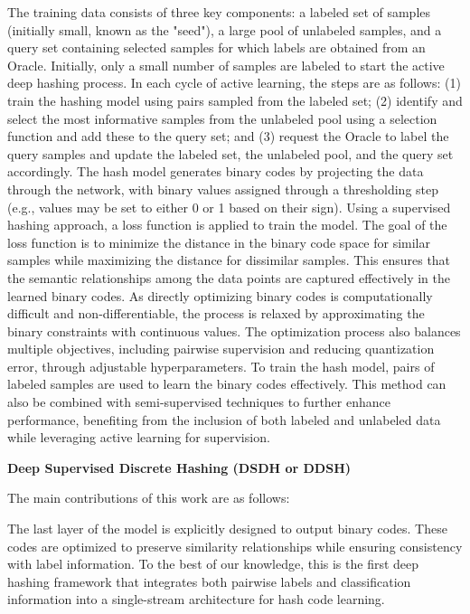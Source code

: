 The training data consists of three key components: a labeled set of samples (initially small, known as the "seed"), a large pool of unlabeled samples, and a query set containing selected samples for which labels are obtained from an Oracle. Initially, only a small number of samples are labeled to start the active deep hashing process. In each cycle of active learning, the steps are as follows: (1) train the hashing model using pairs sampled from the labeled set; (2) identify and select the most informative samples from the unlabeled pool using a selection function and add these to the query set; and (3) request the Oracle to label the query samples and update the labeled set, the unlabeled pool, and the query set accordingly.
The hash model generates binary codes by projecting the data through the network, with binary values assigned through a thresholding step (e.g., values may be set to either 0 or 1 based on their sign). Using a supervised hashing approach, a loss function is applied to train the model. The goal of the loss function is to minimize the distance in the binary code space for similar samples while maximizing the distance for dissimilar samples. This ensures that the semantic relationships among the data points are captured effectively in the learned binary codes.
As directly optimizing binary codes is computationally difficult and non-differentiable, the process is relaxed by approximating the binary constraints with continuous values. The optimization process also balances multiple objectives, including pairwise supervision and reducing quantization error, through adjustable hyperparameters.
To train the hash model, pairs of labeled samples are used to learn the binary codes effectively. This method can also be combined with semi-supervised techniques to further enhance performance, benefiting from the inclusion of both labeled and unlabeled data while leveraging active learning for supervision.

\textbf{Deep Supervised Discrete Hashing (DSDH or DDSH)}

The main contributions of this work are as follows:

The last layer of the model is explicitly designed to output binary codes. These codes are optimized to preserve similarity relationships while ensuring consistency with label information. To the best of our knowledge, this is the first deep hashing framework that integrates both pairwise labels and classification information into a single-stream architecture for hash code learning.
 

